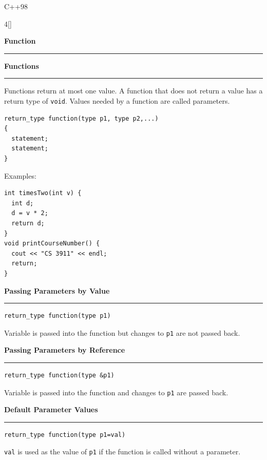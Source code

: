 \documentclass[final]{beamer}
\renewcommand{\section}[1]{%
  \par\vspace{1em}%
  {\noindent\Large\bfseries #1\par}%
  \vspace{0.5em}\hrule\vspace{1em}%
}
\renewcommand{\subsection}[1]{%
  \par\vspace{1em}%
  {\noindent\large\bfseries #1\par}%
  \vspace{0.5em}\hrule\vspace{1em}%
}
\begin{document}
\begin{frame}[t,fragile]{C++98}
\begin{multicols}{4}[\setlength{\columnsep}{1.5cm}]
\section{Function}
 \subsection{Functions}
Functions return at most one value. A function that does not return a value has a return type of \texttt{void}. Values needed by a function are called parameters.
\begin{lstlisting}
return_type function(type p1, type p2,...)
{
  statement;
  statement;
}
\end{lstlisting}
Examples:
\begin{lstlisting}
int timesTwo(int v) {
  int d;
  d = v * 2;
  return d;
}
void printCourseNumber() {
  cout << "CS 3911" << endl;
  return;
}
\end{lstlisting}

 \subsection{Passing Parameters by Value}
\begin{lstlisting}
return_type function(type p1)
\end{lstlisting}
Variable is passed into the function but changes to \texttt{p1} are not passed back.

 \subsection{Passing Parameters by Reference}
\begin{lstlisting}
return_type function(type &p1)
\end{lstlisting}
Variable is passed into the function and changes to \texttt{p1} are passed back.


 \subsection{Default Parameter Values}
\begin{lstlisting}
return_type function(type p1=val)
\end{lstlisting}
\texttt{val} is used as the value of \texttt{p1} if the function is called without a parameter.
\vspace{-1.cm}

\end{multicols}
\end{frame}
\end{document}
